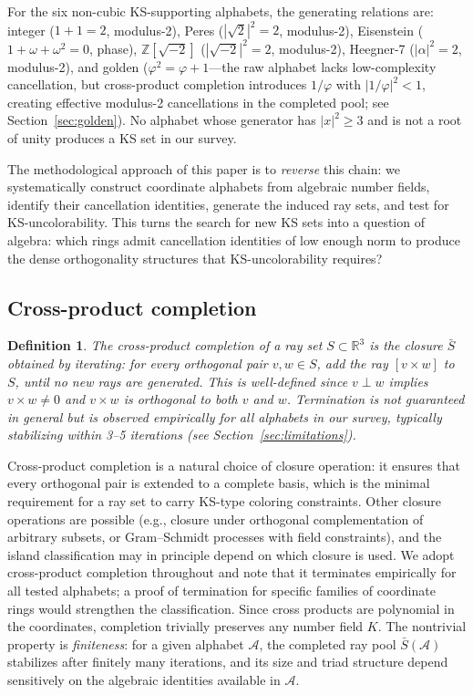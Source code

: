\documentclass[12pt,a4paper]{article}
\newtheorem{definition}[theorem]{Definition}
\newcommand{\R}{\mathbb{R}}
\newcommand{\Z}{\mathbb{Z}}
\begin{document}
For the six non-cubic KS-supporting alphabets, the generating relations are: integer ($1+1=2$, modulus-2), Peres ($|\sqrt{2}|^2=2$, modulus-2), Eisenstein ($1+\omega+\omega^2=0$, phase), $\Z[\sqrt{-2}]$ ($|\sqrt{-2}|^2=2$, modulus-2), Heegner-7 ($|\alpha|^2=2$, modulus-2), and golden ($\varphi^2=\varphi+1$---the raw alphabet lacks low-complexity cancellation, but cross-product completion introduces $1/\varphi$ with $|1/\varphi|^2 < 1$, creating effective modulus-2 cancellations in the completed pool; see Section~\ref{sec:golden}).  No alphabet whose generator has $|x|^2 \geq 3$ and is not a root of unity produces a KS set in our survey.

The methodological approach of this paper is to \emph{reverse} this chain: we systematically construct coordinate alphabets from algebraic number fields, identify their cancellation identities, generate the induced ray sets, and test for KS-uncolorability.  This turns the search for new KS sets into a question of algebra: which rings admit cancellation identities of low enough norm to produce the dense orthogonality structures that KS-uncolorability requires?

\subsection{Cross-product completion}

\begin{definition}\label{def:completion}
The \emph{cross-product completion} of a ray set $S \subset \R^3$ is the closure $\bar{S}$ obtained by iterating: for every orthogonal pair $v, w \in S$, add the ray $[v \times w]$ to $S$, until no new rays are generated. This is well-defined since $v \perp w$ implies $v \times w \neq 0$ and $v \times w$ is orthogonal to both $v$ and $w$. Termination is not guaranteed in general but is observed empirically for all alphabets in our survey, typically stabilizing within 3--5 iterations (see Section~\ref{sec:limitations}).
\end{definition}

Cross-product completion is a natural choice of closure operation: it ensures that every orthogonal pair is extended to a complete basis, which is the minimal requirement for a ray set to carry KS-type coloring constraints.  Other closure operations are possible (e.g., closure under orthogonal complementation of arbitrary subsets, or Gram--Schmidt processes with field constraints), and the island classification may in principle depend on which closure is used.  We adopt cross-product completion throughout and note that it terminates empirically for all tested alphabets; a proof of termination for specific families of coordinate rings would strengthen the classification.  Since cross products are polynomial in the coordinates, completion trivially preserves any number field $K$. The nontrivial property is \emph{finiteness}: for a given alphabet $\mathcal{A}$, the completed ray pool $\bar{S}(\mathcal{A})$ stabilizes after finitely many iterations, and its size and triad structure depend sensitively on the algebraic identities available in $\mathcal{A}$.
\end{document}

